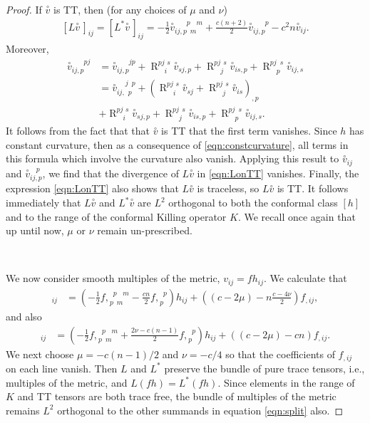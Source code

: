 \documentclass[10pt,reqno]{amsart}
\DeclareMathOperator{\R}{R}
\newcommand{\riem}{\R}
\newcommand{\riemuudu}[4]{\riem_{\phantom{#1 #2} #3 \phantom{#4}}^{#1 #2 \phantom{#3} #4 }}
\newcommand{\ttv}{\stackrel{\circ}{v}}
\newcommand{\gendddudu}[7]{{#1}_{#2#3,#4\phantom{#5}#6\phantom{#7}}^{\phantom{#2#3,#4}#5\phantom{#6}#7}}
\newcommand{\gendddu}[5]{{#1}_{#2 #3, #4}^{\phantom{#2#3,#4} #5}}
\newcommand{\genddduu}[6]{{#1}_{#2 #3, #4}^{\phantom{#2#3,#4} #5#6}}
\newcommand{\genddudu}[6]{{#1}_{#2 #3,\phantom{#4} #5}^{\phantom{#2#3,}#4 \phantom{#5}#6}}
\newcommand{\fdudu}[4]{{f,}_{#1 \phantom{#2} #3 \phantom{#4}}^{\phantom{#1} #2 \phantom{#3} #4}}
\newcommand{\fdu}[2]{{f,}_{#1}^{\phantom{#1} #2}}
\begin{document}
\begin{proof}
If $\ttv$ is TT, then (for any choices of $\mu$ and $\nu$)
\begin{align} \label{eqn:LonTT}
[L\ttv\, ]_{ij} = [L^*\ttv\, ]_{ij} = -\frac{1}{2} \gendddudu{\ttv}{i}{j}{p}{p}{m}{m}+ \frac{c(n+2)}{2} \gendddu{\ttv}{i}{j}{p}{p} - c^2 n \ttv_{ij}.
\end{align}
Moreover, 
\begin{align*}
\genddduu{\ttv}{i}{j}{p}{p}{j} &= \genddduu{\ttv}{i}{j}{p}{j}{p} + \riemuudu{p}{j}{i}{s} \ttv_{sj,p} +\riemuudu{p}{j}{j}{s} \ttv_{is,p} + \riemuudu{p}{j}{p}{s} \ttv_{ij,s} \nonumber \\
&= \genddudu{\ttv}{i}{j}{j}{p}{p} + ( \riemuudu{p}{j}{i}{s} \ttv_{sj} + \riemuudu{p}{j}{j}{s} \ttv_{is} )_{,p} \\
& +  \riemuudu{p}{j}{i}{s} \ttv_{sj,p} +\riemuudu{p}{j}{j}{s} \ttv_{is,p} + \riemuudu{p}{j}{p}{s} \ttv_{ij,s}.\nonumber
\end{align*}
It follows from the fact that that $\ttv$ is TT that the first term vanishes.  Since $h$ has constant curvature, then as a consequence of \eqref{eqn:constcurvature}, all terms in this
formula which involve the curvature also vanish. Applying this result to $\ttv_{ij}$ and $\ttv_{ij,p}^{\ \ \ \ p}$, we find that the divergence of $L\ttv$ in \eqref{eqn:LonTT} vanishes.  
Finally, the expression \eqref{eqn:LonTT} also shows that $L\ttv$ is traceless, so $L\ttv$ is TT.  It follows immediately that $L\ttv$ and $L^* \ttv$ 
are $L^2$ orthogonal to both the conformal class $[h]$ and to the range of the conformal Killing operator $K$.    We recall once again that
up until now, $\mu$ or $\nu$ remain un-prescribed. 

\
 
We now consider smooth multiples of the metric, $v_{ij} = f h_{ij}$. We calculate that
\begin{align*}
[L (fh)]_{ij} &= \left( -\frac{1}{2} \fdudu{p}{p}{m}{m} - \frac{c n }{2} \fdu{p}{p} \right) h_{ij} + \left ( (c-2\mu) - n \frac{c-4\nu}{2} \right) f_{,ij},
\end{align*}
and also 
\begin{align*}
[L^* (f h)]_{ij} &= \left( -\frac{1}{2} \fdudu{p}{p}{m}{m} + \frac{2 \nu - c (n-1)}{2} \fdu{p}{p} \right) h_{ij} + \left ( (c-2\mu) - c n \right) f_{,ij}.
\end{align*}
We next choose $\mu = -c(n-1)/2$ and $\nu = -c/4$ so that the coefficients of $f_{, ij}$ on each line vanish. Then $L$ and $L^*$ preserve the bundle 
of pure trace tensors, i.e., multiples of the metric, and $L(fh)=L^*(fh).$ Since elements in the range of $K$ and TT tensors are 
both trace free, the bundle of multiples of the metric remains $L^2$ orthogonal to the other summands in equation \eqref{eqn:split} also.


\end{proof}
\end{document}
